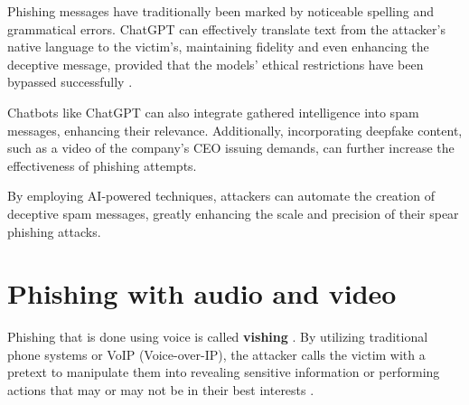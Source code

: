 Phishing messages have traditionally been marked by noticeable spelling and grammatical errors. ChatGPT can effectively translate text from the attacker’s native language to the victim’s, maintaining fidelity and even enhancing the deceptive message, provided that the models' ethical restrictions have been bypassed successfully \citep{guptaFromChatGPTtoThreatGPT2023}.

Chatbots like ChatGPT can also integrate gathered intelligence into spam messages, enhancing their relevance. Additionally, incorporating deepfake content, such as a video of the company’s CEO issuing demands, can further increase the effectiveness of phishing attempts.

By employing AI-powered techniques, attackers can automate the creation of deceptive spam messages, greatly enhancing the scale and precision of their spear phishing attacks.




















\section{Phishing with audio and video}
\begin{comment}
Phishing & spear phishing

What to cover:
    - What is phishing (via email and ALSO other means)
    - Spear phishing a more targeted form of phishing
    - How ChatGPT can be used to improve scam messages
    - ChatGPT:n eettisten ohjeistusten ohittaminen on jo käsitelty kohdassa Chatbots

\end{comment}

Phishing that is done using voice is called \textbf{vishing} \citep{salahdineSocialEngineeringAttacks2019}. By utilizing traditional phone systems or VoIP (Voice-over-IP), the attacker calls the victim with a pretext to manipulate them into revealing sensitive information or performing actions that may or may not be in their best interests \citep{hadnagySocialEngineering2018}.



